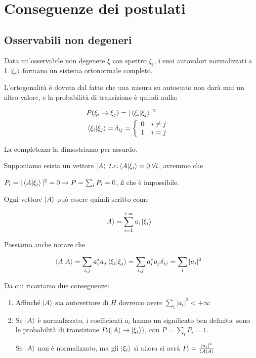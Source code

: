 \newpage
 
\section{Conseguenze dei postulati}
 
\subsection{Osservabili non degeneri}
 
Data un'osservabile non degenere $\xi$ con spettro $\xi_i$, i suoi autovalori normalizzati a 1 $\ket{\xi_i}$ formano un sistema ortonormale completo.

\bigskip

L'ortogonalità è dovuta dal fatto che una misura su autostato non darà mai un altro valore, e la probabilità di transizione è quindi nulla:

\begin{align}
{}&P(\xi_i \rightarrow \xi_j)= |\braket{\xi_i|\xi_j}|^2 \\
&\braket{\xi_i|\xi_j} = \delta_{ij}= \left\{
\begin{array}{cc}
0 \quad i \neq j \\
1 \quad i = j
\end{array}
\right.
\end{align}


\bigskip

La completezza la dimostriamo per assurdo.

Supponiamo esista un vettore $\ket{A} \; t.c. \braket{A|\xi_i}=0 \; \forall i$, avremmo che

 $P_i= |\braket{A|\xi_i}|^2=0 \rightarrow P= \sum_i P_i=0$, il che  è impossibile.

\bigskip

Ogni vettore $\ket{A}$ può essere quindi scritto come

\begin{align}
\ket{A}= \sum_{i=1}^{+\infty} a_i \ket{\xi_i}
\end{align}

Possiamo anche notare che 

\begin{align}
\braket{A|A}= \sum_{i,j} a_i^* a_j \braket{\xi_i|\xi_j} = \sum_{i,j} a_i^* a_j \delta_{ij} = \sum_{i} |a_i|^2
\end{align}

Da cui ricaviamo due conseguenze:

\begin{enumerate}
	\item Affinché $\ket{A}$ sia autovettore di $H$ dovremo avere $\sum_{i} |a_i|^2<+\infty$
	\item Se $\ket{A}$ è normalizzato, i coefficienti $a_i$ hanno un significato ben definito: sono le probabilità di transizione $P_i(\ket{A} \rightarrow \ket{\xi_i})$, con $P=\sum_i P_i=1$.
	
	 Se $\ket{A}$ non è normalizzato, ma gli $\ket{\xi_i}$ sì allora si avrà $P_i= \frac{|a_i|^2}{\braket{A|A}}$
\end{enumerate}

